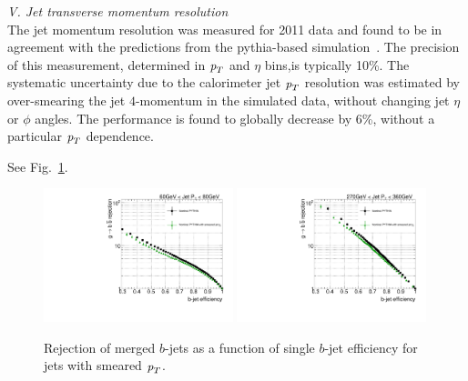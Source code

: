 \vspace{3mm}
{ \em V. Jet transverse momentum resolution}
\\[3mm]
The jet momentum resolution was measured for 2011 data and found to be in agreement with the predictions from the {\sc pythia}-based simulation~\cite{JER2011}. The precision of this measurement, determined in ${\emph{p}_{T}}$ and $\eta$ bins,is typically 10\%.
The systematic uncertainty due to the calorimeter jet ${\emph{p}_{T}}$ resolution was estimated by over-smearing the jet $4$-momentum in the simulated data, without changing jet $\eta$ or $\phi$ angles. The performance is found to globally decrease by 6\%, without a particular ${\emph{p}_{T}}$ dependence.

See Fig.~\ref{fig:jetresolution}.

\begin{figure}[tp]
\centering
\includegraphics[width=0.49\textwidth]{FIGS/systematics/LlhoodKDE_ISO_SmearedJetPtTest_rejvseff060.pdf}
\includegraphics[width=0.49\textwidth]{FIGS/systematics/LlhoodKDE_ISO_SmearedJetPtTest_rejvseff270.pdf}
\caption{Rejection of merged $b$-jets as a function of single $b$-jet efficiency for jets with smeared ${\emph{p}_{T}}$.}
\label{fig:jetresolution}
\end{figure}


